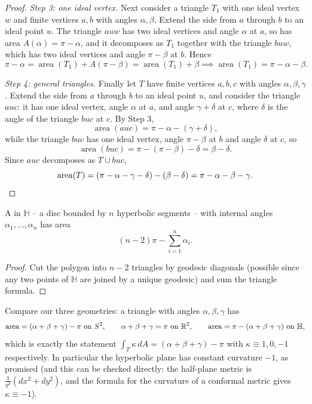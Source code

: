 \documentclass[a4paper]{scrartcl}
\newcommand{\HH}{\mathbb{H}}
\begin{document}
\begin{proof}
    \emph{Step 3: one ideal vertex.} Next consider a triangle $T_1$ with one ideal vertex $w$ and finite vertices $a, b$ with angles $\alpha, \beta$. Extend the side from $a$ through $b$ to an ideal point $u$. The triangle $a u w$ has two ideal vertices and angle $\alpha$ at $a$, so has area $A(\alpha) = \pi - \alpha$, and it decomposes as $T_1$ together with the triangle $b u w$, which has two ideal vertices and angle $\pi - \beta$ at $b$. Hence
    $$
    \pi - \alpha = \operatorname{area}(T_1) + A(\pi - \beta) = \operatorname{area}(T_1) + \beta \implies \operatorname{area}(T_1) = \pi - \alpha - \beta.
    $$

    \emph{Step 4: general triangles.} Finally let $T$ have finite vertices $a, b, c$ with angles $\alpha, \beta, \gamma$. Extend the side from $a$ through $b$ to an ideal point $u$, and consider the triangle $a u c$: it has one ideal vertex, angle $\alpha$ at $a$, and angle $\gamma + \delta$ at $c$, where $\delta$ is the angle of the triangle $b u c$ at $c$. By Step 3,
    $$
    \operatorname{area}(auc) = \pi - \alpha - (\gamma + \delta),
    $$
    while the triangle $buc$ has one ideal vertex, angle $\pi - \beta$ at $b$ and angle $\delta$ at $c$, so
    $$
    \operatorname{area}(buc) = \pi - (\pi - \beta) - \delta = \beta - \delta.
    $$
    Since $auc$ decomposes as $T \cup buc$,
    $$
    \operatorname{area}(T) = \left(\pi - \alpha - \gamma - \delta\right) - \left(\beta - \delta\right) = \pi - \alpha - \beta - \gamma. \qedhere
    $$
\end{proof}

\begin{corollary}
    A  in $\HH$ -- a disc bounded by $n$ hyperbolic segments -- with internal angles $\alpha_1, \dots, \alpha_n$ has area
    $$
    (n - 2)\pi - \sum_{i = 1}^n \alpha_i.
    $$
\end{corollary}
\begin{proof}
    Cut the polygon into $n - 2$ triangles by geodesic diagonals (possible since any two points of $\HH$ are joined by a unique geodesic) and sum the triangle formula.
\end{proof}

Compare our three geometries: a triangle with angles $\alpha, \beta, \gamma$ has
$$
\operatorname{area} = (\alpha + \beta + \gamma) - \pi \text{ on } S^2, \qquad \alpha + \beta + \gamma = \pi \text{ on } \R^2, \qquad \operatorname{area} = \pi - (\alpha + \beta + \gamma) \text{ on } \HH,
$$
which is exactly the statement $\int_T \kappa \, dA = (\alpha + \beta + \gamma) - \pi$ with $\kappa \equiv 1, 0, -1$ respectively. In particular the hyperbolic plane has constant curvature $-1$, as promised (and this can be checked directly: the half-plane metric is $\frac{1}{y^2}(dx^2 + dy^2)$, and the formula for the curvature of a conformal metric gives $\kappa \equiv -1$).
\end{document}
